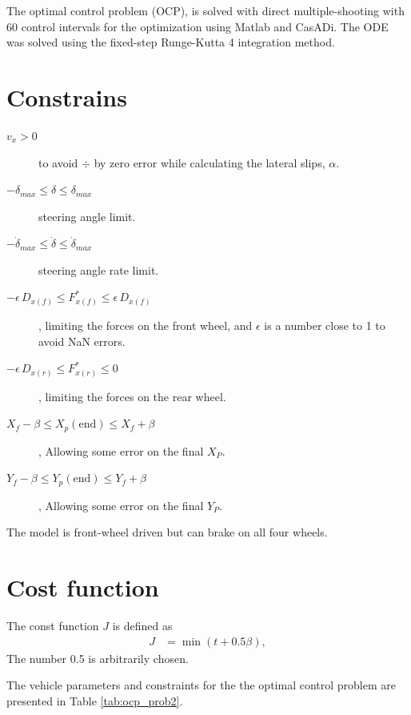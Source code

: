 The optimal control problem (OCP), is solved with direct multiple-shooting with 60 control intervals for the optimization using Matlab and CasADi. The ODE was solved using the fixed-step Runge-Kutta 4 integration method. 

\section{Constrains}
\begin{description}
    \item[$v_x > 0$] to avoid $\div$ by zero error while calculating the lateral slips, $\alpha$.
    \item[$-\delta_{max} \leq \delta \leq \delta_{max}$] steering angle limit.
    \item[$-\dot\delta_{max} \leq \dot\delta \leq \dot\delta_{max}$] steering angle rate limit.
    \item[$-\epsilon\,D_{x(f)} \leq F_{x(f)}^* \leq \epsilon\,D_{x(f)}$], limiting the forces on the front wheel, and $\epsilon$ is a number close to 1 to avoid NaN errors. 
    \item[$-\epsilon\,D_{x(r)} \leq F_{x(r)}^* \leq 0$], limiting the forces on the rear wheel.
    \item[$X_f - \beta \leq X_p(\text{end}) \leq X_f + \beta $], Allowing some error on the final $X_P$.
    \item[$Y_f - \beta \leq Y_p(\text{end}) \leq Y_f + \beta $], Allowing some error on the final $Y_P$.
\end{description}
The model is front-wheel driven but can brake on all four wheels.

\section{Cost function}
The const function $J$ is defined as 
\begin{align}
    J &= \min{\left(t + 0.5\beta\right)},
\end{align}
The number 0.5 is arbitrarily chosen. 

The vehicle parameters and constraints for the the optimal control problem are presented in Table \ref{tab:ocp_prob2}.

